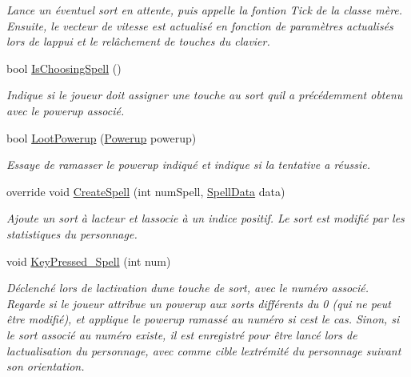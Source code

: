 \begin{DoxyCompactItemize}
\begin{DoxyCompactList}\small\item\em Lance un éventuel sort en attente, puis appelle la fontion Tick de la classe mère. Ensuite, le vecteur de vitesse est actualisé en fonction de paramètres actualisés lors de l\textquotesingle{}appui et le relâchement de touches du clavier. \end{DoxyCompactList}\item 
bool \hyperlink{class_tentacle_slicers_1_1actors_1_1_player_character_a6d99c2fc9ae39b200026d6e2dc706878}{Is\+Choosing\+Spell} ()
\begin{DoxyCompactList}\small\item\em Indique si le joueur doit assigner une touche au sort qu\textquotesingle{}il a précédemment obtenu avec le powerup associé. \end{DoxyCompactList}\item 
bool \hyperlink{class_tentacle_slicers_1_1actors_1_1_player_character_aa137852ffa3d88b5f75fc8ba0f020651}{Loot\+Powerup} (\hyperlink{class_tentacle_slicers_1_1actors_1_1_powerup}{Powerup} powerup)
\begin{DoxyCompactList}\small\item\em Essaye de ramasser le powerup indiqué et indique si la tentative a réussie. \end{DoxyCompactList}\item 
override void \hyperlink{class_tentacle_slicers_1_1actors_1_1_player_character_a7d7616298f1762e11f8824f0b77dec64}{Create\+Spell} (int num\+Spell, \hyperlink{class_tentacle_slicers_1_1spells_1_1_spell_data}{Spell\+Data} data)
\begin{DoxyCompactList}\small\item\em Ajoute un sort à l\textquotesingle{}acteur et l\textquotesingle{}associe à un indice positif. Le sort est modifié par les statistiques du personnage. \end{DoxyCompactList}\item 
void \hyperlink{class_tentacle_slicers_1_1actors_1_1_player_character_a5014d03cdb591f545e08f599cf314770}{Key\+Pressed\+\_\+\+Spell} (int num)
\begin{DoxyCompactList}\small\item\em Déclenché lors de l\textquotesingle{}activation d\textquotesingle{}une touche de sort, avec le numéro associé. Regarde si le joueur attribue un powerup aux sorts différents du 0 (qui ne peut être modifié), et applique le powerup ramassé au numéro si c\textquotesingle{}est le cas. Sinon, si le sort associé au numéro existe, il est enregistré pour être lancé lors de l\textquotesingle{}actualisation du personnage, avec comme cible l\textquotesingle{}extrémité du personnage suivant son orientation. \end{DoxyCompactList}\item 

\end{DoxyCompactItemize}
